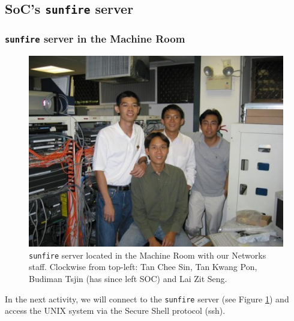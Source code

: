 \documentclass[a4paper]{beamer}
\newcommand{\ftitle}[1]{\frametitle<presentation>{#1}}
\begin{document}
\subsection{SoC's \texttt{sunfire} server}
\begin{frame}
\ftitle{\texttt{sunfire} server in the Machine Room}
\begin{figure}
\begin{center}
\includegraphics[scale=0.5]{machine_room}
\caption{\texttt{sunfire} server located in the Machine Room with our Networks
staff. Clockwise from top-left: Tan Chee Sin, Tan Kwang Pon, Budiman Tsjin
(has since left SOC) and Lai Zit Seng.}
\label{fig:sunfire}
\end{center}
\end{figure}
\end{frame}

In the next activity, we will connect to the \texttt{sunfire} server (see Figure
\ref{fig:sunfire}) and access the UNIX system via the Secure Shell protocol
(ssh).
\end{document}
